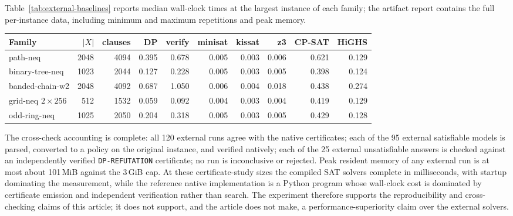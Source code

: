 \documentclass[11pt]{article}
\theoremstyle{plain}
\theoremstyle{definition}
\theoremstyle{remark}
\begin{document}
Table~\ref{tab:external-baselines} reports median wall-clock times at the
largest instance of each family; the artifact report contains the full
per-instance data, including minimum and maximum repetitions and peak memory.

\begin{center}
\begin{tabular}{@{}lrrrrrrrrr@{}}
\toprule
Family & $|X|$ & clauses & DP & verify & minisat & kissat & z3 & CP-SAT & HiGHS\\
\midrule
path-neq & 2048 & 4094 & 0.395 & 0.678 & 0.005 & 0.003 & 0.006 & 0.621 & 0.129\\
binary-tree-neq & 1023 & 2044 & 0.127 & 0.228 & 0.005 & 0.003 & 0.005 & 0.398 & 0.124\\
banded-chain-w2 & 2048 & 4092 & 0.687 & 1.050 & 0.006 & 0.004 & 0.018 & 0.438 & 0.274\\
grid-neq $2\times 256$ & 512 & 1532 & 0.059 & 0.092 & 0.004 & 0.003 & 0.004 & 0.419 & 0.129\\
odd-ring-neq & 1025 & 2050 & 0.204 & 0.318 & 0.005 & 0.003 & 0.005 & 0.429 & 0.128\\
\bottomrule
\end{tabular}
\label{tab:external-baselines}
\end{center}

The cross-check accounting is complete: all 120 external runs agree with the
native certificates; each of the 95 external satisfiable models is parsed,
converted to a policy on the original instance, and verified natively; each of
the 25 external unsatisfiable answers is checked against an independently
verified \texttt{DP-REFUTATION} certificate; no run is inconclusive or
rejected.  Peak resident memory of any external run is at most about
101\,MiB against the 3\,GiB cap.  At these certificate-study sizes the
compiled SAT solvers complete in milliseconds, with startup dominating the
measurement, while the reference native implementation is a Python program
whose wall-clock cost is dominated by certificate emission and independent
verification rather than search.  The experiment therefore supports the
reproducibility and cross-checking claims of this article; it does not support,
and the article does not make, a performance-superiority claim over the
external solvers.
\end{document}
